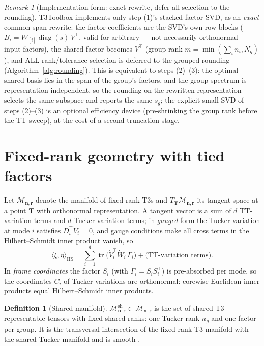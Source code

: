 \documentclass[11pt]{article}
\theoremstyle{definition}
\newtheorem{definition}[theorem]{Definition}
\theoremstyle{remark}
\newtheorem{remark}[theorem]{Remark}
\newcommand{\T}{\boldsymbol{T}}
\newcommand{\tr}{\operatorname{tr}}
\newcommand{\HS}{\mathrm{HS}}
\newcommand{\Mnr}{\mathcal{M}_{\boldsymbol{n},\boldsymbol{r}}}
\newcommand{\Msh}{\mathcal{M}^{\mathrm{sh}}_{\boldsymbol{n},\boldsymbol{r}}}
\begin{document}
\begin{remark}[Implementation form: exact rewrite, defer all selection to the
rounding]
T3Toolbox implements only step (1)'s stacked-factor SVD, as an \emph{exact}
common-span rewrite: the factor coefficients are the SVD's own row blocks
($B_i = W_{[i]} \operatorname{diag}(s)\, V^\top$, valid for arbitrary --- not
necessarily orthonormal --- input factors), the shared factor becomes
$V^\top$ (group rank $m = \min(\sum_i n_i, N_g)$), and ALL rank/tolerance
selection is deferred to the grouped rounding
(Algorithm~\ref{alg:rounding}). This is equivalent to steps (2)--(3): the
optimal shared basis lies in the span of the group's factors, and the group
spectrum is representation-independent, so the rounding on the rewritten
representation selects the same subspace and reports the same $s_g$; the
explicit small SVD of steps (2)--(3) is an optional efficiency device
(pre-shrinking the group rank before the TT sweep), at the cost of a second
truncation stage.
\end{remark}

\section{Fixed-rank geometry with tied factors}\label{sec:geometry}

Let $\Mnr$ denote the manifold of fixed-rank T3s and
$T_{\T}\Mnr$ its tangent space at a point $\T$ with orthonormal
representation. A tangent vector is a sum of $d$ TT-variation terms and $d$
Tucker-variation terms; in \emph{gauged} form the Tucker variation at mode
$i$ satisfies $D_i^\top \dot V_i = 0$, and gauge conditions make all cross
terms in the Hilbert--Schmidt inner product vanish, so
\begin{equation}\label{eq:hsnorm}
\langle \xi, \eta \rangle_{\HS}
= \sum_{i=1}^{d} \tr\bigl( \dot V_i^\top \dot W_i\, \Gamma_i \bigr)
+ \text{(TT-variation terms)} .
\end{equation}
In \emph{frame coordinates} the factor $S_i$ (with $\Gamma_i = S_i S_i^\top$)
is pre-absorbed per mode, so the coordinates $C_i$ of Tucker variations are
orthonormal: corewise Euclidean inner products equal Hilbert--Schmidt inner
products.

\begin{definition}[Shared manifold]
$\Msh \subset \Mnr$ is the set of shared T3-representable tensors with fixed
shared ranks: one Tucker rank $n_g$ and one factor per group. It is the
transversal intersection of the fixed-rank T3 manifold with the shared-Tucker
manifold and is smooth \cite[Thm.~5]{MR2026}.
\end{definition}
\end{document}
